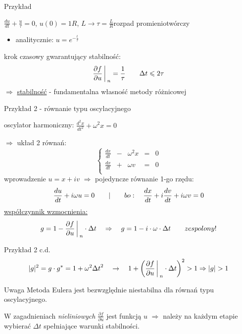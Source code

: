 
\begin{frame}{Przykład}
	\begin{center}
	$\frac{du}{dt}+\frac{u}{\tau} = 0$, \quad $u(0) = 1$\newline $R$, $L\rightarrow \tau = \frac{L}{R}$\qquad rozpad promieniotwórczy\par
      \begin{itemize}
    \item analitycznie: $u = e^{-\frac{t}{\tau}}$
    \end{itemize}
	\end{center}
  
  krok czasowy gwarantujący stabilność:
  $$\frac{\partial f}{\partial u}\bigg\arrowvert_n = \frac{1}{\tau}\qquad \Delta t \leqslant 2\tau$$
  $\Rightarrow$ \underline{stabilność} - fundamentalna własność metody różnicowej
\end{frame}

\begin{frame}{Przykład 2 - równanie typu oscylacyjnego}
	\begin{center}
		oscylator harmoniczny: \qquad $\frac{d^2x}{dt^2}+ \omega^2x=0$
	\end{center}
    $\Rightarrow$ układ 2 równań:
    $$\left\{\begin{array}{lccll}
	\frac{dx}{dt}&-&\omega^2x&=&0\\
	\frac{dx}{dt}&+&\omega v&=&0\\
	\end{array} \right.$$
    wprowadzenie \qquad \underline{$u = x+iv$} $\Rightarrow$ pojedyncze równanie 1-go rzędu:
    $$ \frac{du}{dt} + i\omega u= 0 \qquad \arrowvert \qquad bo: \quad \frac{dx}{dt} + i\frac{dv}{dt}+i\omega v = 0$$
    \underline{współczynnik wzmocnienia:}
    $$g = 1-{\frac{\partial f}{\partial u}}\bigg\arrowvert _n \cdot \Delta t \quad \Rightarrow \quad g=1-i\cdot \omega \cdot \Delta t \qquad zespolony!$$
\end{frame}

\begin{frame}{Przykład 2 c.d.}
	$$|g|^2 = g \cdot g^* = 1+\omega^2 {\Delta t}^2 \quad \rightarrow \quad 1+\bigg(\frac{\partial f}{\partial u}\bigg{\arrowvert}_n \cdot \Delta t\bigg)^2 > 1 \Rightarrow |g| > 1 $$
    \begin{block}{Uwaga}
    	Metoda Eulera jest bezwzględnie niestabilna dla równań typu oscylacyjnego.
    \end{block}
    W zagadnieniach \textit{nieliniowych $\frac{\partial f}{\partial u}$} jest funkcją $u$ \quad $\Rightarrow$ \quad należy na każdym etapie wybierać $\Delta t$ spełniające warunki stabilności. 
\end{frame}
